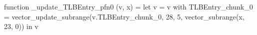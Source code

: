 function _update_TLBEntry_pfn0 (v, x) = let v = { v with TLBEntry_chunk_0 = vector_update_subrange(v.TLBEntry_chunk_0, 28, 5, vector_subrange(x, 23, 0)) } in v
